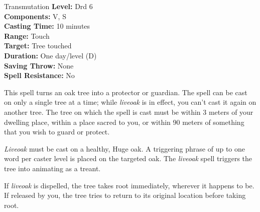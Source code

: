 {Transmutation}
{
	\textbf{Level:}
	Drd 6\\
	\textbf{Components:}
	V, S\\
	\textbf{Casting Time:}
	10 minutes\\
	\textbf{Range:}
	Touch\\
	\textbf{Target:}
	Tree touched\\
	\textbf{Duration:}
	One day/level (D)\\
	\textbf{Saving Throw:}
	None\\
	\textbf{Spell Resistance:}
	No\\
}
{
	This spell turns an oak tree into a protector or guardian. The spell can be cast on only a single tree at a time; while \emph{liveoak} is in effect, you can't cast it again on another tree. The tree on which the spell is cast must be within 3 meters of your dwelling place, within a place sacred to you, or within 90 meters of something that you wish to guard or protect.

	\emph{Liveoak} must be cast on a healthy, Huge oak. A triggering phrase of up to one word per caster level is placed on the targeted oak. The \emph{liveoak} spell triggers the tree into animating as a treant.

	If \emph{liveoak} is dispelled, the tree takes root immediately, wherever it happens to be. If released by you, the tree tries to return to its original location before taking root.

}
